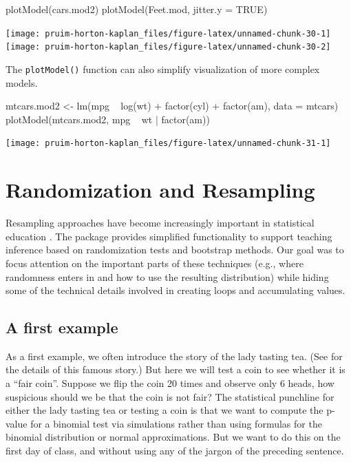 \begin{Schunk}
\begin{Sinput}
plotModel(cars.mod2)
plotModel(Feet.mod, jitter.y = TRUE)
\end{Sinput}


\begin{center}\texttt{[image: pruim-horton-kaplan\_files/figure-latex/unnamed-chunk-30-1]} \texttt{[image: pruim-horton-kaplan\_files/figure-latex/unnamed-chunk-30-2]} \end{center}

\end{Schunk}

\noindent
The \texttt{plotModel()} function can also simplify visualization of
more complex models.

\begin{Schunk}
\begin{Sinput}
mtcars.mod2 <- lm(mpg ~ log(wt) + factor(cyl) + factor(am), data = mtcars)
plotModel(mtcars.mod2, mpg ~ wt | factor(am))
\end{Sinput}


\begin{center}\texttt{[image: pruim-horton-kaplan\_files/figure-latex/unnamed-chunk-31-1]} \end{center}

\end{Schunk}

\section{Randomization and
Resampling}\label{randomization-and-resampling}

Resampling approaches have become increasingly important in statistical
education \citep{Tintle:TAS:2015, Hesterberg:2015}. The 
package provides simplified functionality to support teaching inference
based on randomization tests and bootstrap methods. Our goal was to
focus attention on the important parts of these techniques (e.g., where
randomness enters in and how to use the resulting distribution) while
hiding some of the technical details involved in creating loops and
accumulating values.

\subsection{A first example}\label{a-first-example}

As a first example, we often introduce the story of the lady tasting
tea. (See \cite{Salsburg:2002} for the details of this famous story.)
But here we will test a coin to see whether it is a ``fair coin''.
Suppose we flip the coin 20 times and observe only 6 heads, how
suspicious should we be that the coin is not fair? The statistical
punchline for either the lady tasting tea or testing a coin is that we
want to compute the p-value for a binomial test via simulations rather
than using formulas for the binomial distribution or normal
approximations. But we want to do this on the first day of class, and
without using any of the jargon of the preceding sentence.


